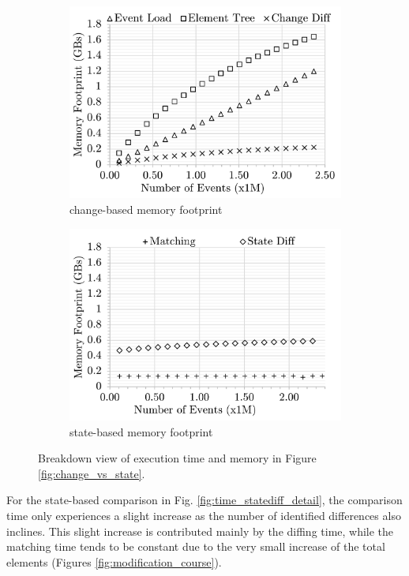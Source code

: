 \documentclass{jot}
\begin{document}
\begin{figure}[ht]
\begin{subfigure}[t]{0.495\linewidth}
        \includegraphics[width=\linewidth]{mixed-memory-events-detail}
        \caption{change-based memory footprint}
        \label{fig:memory_changediff_detail}
    \end{subfigure}
    \hfill
    \begin{subfigure}[t]{0.495\linewidth}
        \includegraphics[width=\linewidth]{state-memory-events-detail}
        \caption{state-based memory footprint}
        \label{fig:memory_statediff_detail}
    \end{subfigure}
    \caption{Breakdown view of execution time and memory in Figure \ref{fig:change_vs_state}.}
    \label{fig:time_memory_detail}
\end{figure}

For the state-based comparison in Fig. \ref{fig:time_statediff_detail}, the comparison time only experiences a slight increase as the number of identified differences also inclines. This slight increase is contributed mainly by the diffing time, while the matching time tends to be constant due to the very small increase of the total elements (Figures \ref{fig:modification_course}).
\end{document}
